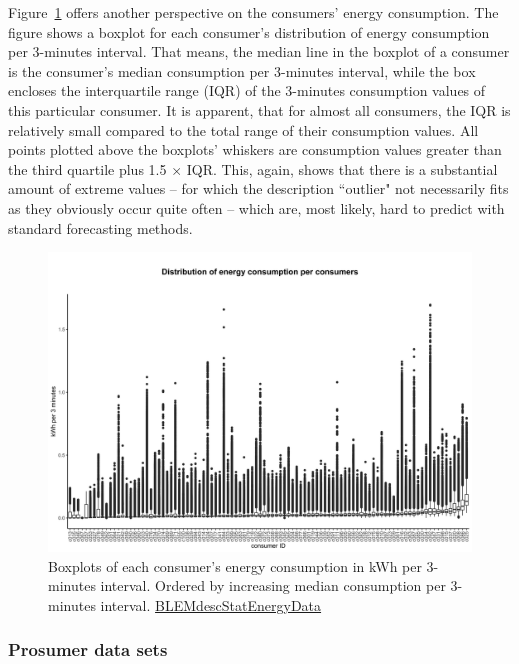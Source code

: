 Figure~\ref{Fig:cons_boxplots_consumption} offers another perspective on the consumers' energy consumption. The figure shows a boxplot for each consumer's distribution of energy consumption per 3-minutes interval. That means, the median line in the boxplot of a consumer is the consumer's median consumption per 3-minutes interval, while the box encloses the interquartile range (IQR) of the 3-minutes consumption values of this particular consumer. It is apparent, that for almost all consumers, the IQR is relatively small compared to the total range of their consumption values. All points plotted above the boxplots' whiskers are consumption values greater than the third quartile plus 1.5 $\times$ IQR. This, again, shows that there is a substantial amount of extreme values -- for which the description ``outlier" not necessarily fits as they obviously occur quite often -- which are, most likely, hard to predict with standard forecasting methods.
%
\begin{figure}[ht]
 \centering
\includegraphics[width=\textwidth]{thesis/graphs/consumer_boxplots_consumption.jpg}
\caption[Boxplots of each consumer's energy consumption in kWh/3-minutes interval]{Boxplots of each consumer's energy consumption in kWh per 3-minutes interval. Ordered by increasing median consumption per 3-minutes interval. \quantnet\href{https://github.com/QuantLet/BLEM/tree/master/BLEMdescStatEnergyData}{BLEMdescStatEnergyData}}
\label{Fig:cons_boxplots_consumption}
\end{figure}



\subsubsection{Prosumer data sets}

